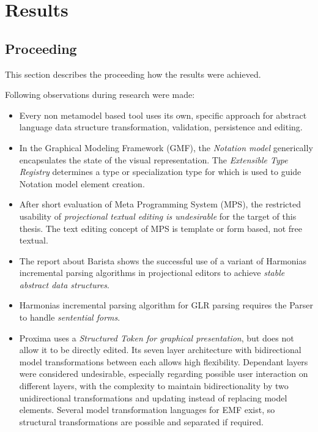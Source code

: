 \chapter{Results}


\section{Proceeding} 
This section describes the proceeding how the results were achieved.

Following observations during research were made:
\begin{itemize}
	\item Every non metamodel based tool uses its own, specific approach for abstract language data structure transformation, validation, persistence and editing.
	\item In the Graphical Modeling Framework (GMF), the \emph{Notation model} generically encapsulates the state of the visual representation. The \emph{Extensible Type Registry} determines a type or specialization type for which is used to guide Notation model element creation. 
	\item After short evaluation of Meta Programming System (MPS), the restricted usability of \emph{projectional textual editing is undesirable} for the target of this thesis. The text editing concept of MPS is template or form based, not free textual.
	\item The report \cite{Barista} about Barista shows the successful use of a variant of Harmonias incremental parsing algorithms in projectional editors to achieve \emph{stable abstract data structures}.
	\item Harmonias incremental parsing algorithm for GLR parsing requires the Parser to handle \emph{sentential forms}.
	\item Proxima uses a \emph{Structured Token for graphical presentation}, but does not allow it to be directly edited.  Its seven layer architecture with bidirectional model transformations between each allows high flexibility. Dependant layers were considered undesirable, especially regarding possible user interaction on different layers, with the complexity to maintain bidirectionality by two unidirectional transformations and updating instead of replacing model elements. Several model transformation languages for EMF exist, so structural transformations are possible and separated if required. 
\end{itemize}

